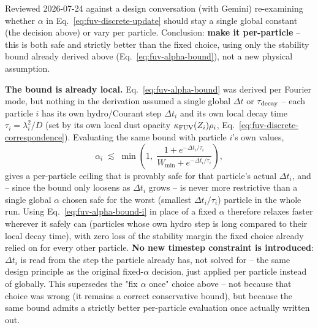 Reviewed 2026-07-24 against a design conversation (with Gemini)
re-examining whether $\alpha$ in Eq.~\ref{eq:fuv-discrete-update} should
stay a single global constant (the decision above) or vary per particle.
Conclusion: \textbf{make it per-particle} -- this is both safe and
strictly better than the fixed choice, using only the stability bound
already derived above (Eq.~\ref{eq:fuv-alpha-bound}), not a new physical
assumption.

\textbf{The bound is already local.} Eq.~\ref{eq:fuv-alpha-bound} was
derived per Fourier mode, but nothing in the derivation assumed a single
global $\Delta t$ or $\tau_{\rm decay}$ -- each particle $i$ has its own
hydro/Courant step $\Delta t_i$ and its own local decay time
$\tau_i=\lambda_i^2/D$ (set by its own local dust opacity
$\kappa_{\rm FUV}(Z_i)\rho_i$, Eq.~\ref{eq:fuv-discrete-correspondence}).
Evaluating the same bound with particle $i$'s own values,
\begin{equation}
  \alpha_i \;\lesssim\; \min\!\left(1,\;
    \frac{1+e^{-\Delta t_i/\tau_i}}{W_{\min}+e^{-\Delta t_i/\tau_i}}\right),
  \label{eq:fuv-alpha-bound-i}
\end{equation}
gives a per-particle ceiling that is provably safe for that particle's
actual $\Delta t_i$, and -- since the bound only loosens as $\Delta t_i$
grows -- is never more restrictive than a single global $\alpha$ chosen
safe for the worst (smallest $\Delta t_i/\tau_i$) particle in the whole
run. Using Eq.~\ref{eq:fuv-alpha-bound-i} in place of a fixed $\alpha$
therefore relaxes faster wherever it safely can (particles whose own
hydro step is long compared to their local decay time), with zero loss
of the stability margin the fixed choice already relied on for every
other particle. \textbf{No new timestep constraint is introduced}:
$\Delta t_i$ is read from the step the particle already has, not solved
for -- the same design principle as the original fixed-$\alpha$
decision, just applied per particle instead of globally. This
supersedes the "fix $\alpha$ once" choice above -- not because that
choice was wrong (it remains a correct conservative bound), but because
the same bound admits a strictly better per-particle evaluation once
actually written out.

